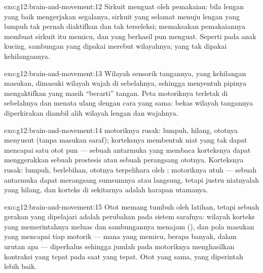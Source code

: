 \begin{solution}{exo:g12:brain-and-movement:12}
Sirkuit menguat oleh pemakaian: bila lengan yang baik mengerjakan
segalanya, sirkuit yang selamat menuju lengan yang lumpuh tak pernah
diaktifkan dan tak terseleksi; memaksakan pemakaiannya membuat sirkuit
itu memicu, dan yang berhasil pun menguat. Seperti pada anak kucing,
sambungan yang dipakai merebut wilayahnya; yang tak dipakai
kehilangannya.
\end{solution}

\begin{solution}{exo:g12:brain-and-movement:13}
Wilayah sensorik tangannya, yang kehilangan masukan, dimasuki wilayah
wajah di sebelahnya, sehingga menyentuh pipinya mengaktifkan 
yang masih ``berarti'' tangan. Peta motoriknya terletak di sebelahnya
dan menata ulang dengan cara yang sama: bekas wilayah tangannya
diperkirakan diambil alih wilayah lengan dan wajahnya.
\end{solution}

\begin{solution}{exo:g12:brain-and-movement:14}
 motoriknya rusak: lumpuh,  hilang, ototnya menyusut
(tanpa masukan saraf); korteksnya membentuk niat yang tak dapat
mencapai satu otot pun --- sebuah antarmuka yang membaca korteksnya
dapat menggerakkan sebuah prostesis atau sebuah perangsang ototnya.
Korteksnya rusak: lumpuh,  berlebihan, ototnya terpelihara
oleh ;  motoriknya utuh --- sebuah antarmuka dapat
merangsang sumsumnya atau  langsung, tetapi justru niatnyalah
yang hilang, dan  korteks di sekitarnya adalah harapan
utamanya.
\end{solution}

\begin{solution}{exo:g12:brain-and-movement:15}
Otot memang tumbuh oleh latihan, tetapi sebuah gerakan yang dipelajari
adalah perubahan pada sistem sarafnya: wilayah korteks yang
memerintahnya meluas dan sambungannya menajam (), dan pola
masukan yang mencapai tiap  motorik --- mana yang memicu, berapa
banyak, dalam urutan apa --- diperhalus sehingga jumlah pada 
motoriknya menghasilkan kontraksi yang tepat pada saat yang tepat. Otot
yang sama, yang diperintah lebih baik.
\end{solution}

